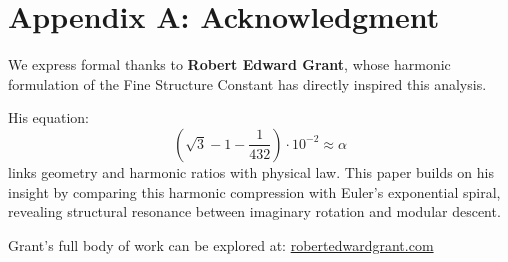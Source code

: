 \documentclass[12pt]{article}
\begin{document}
\appendix

\section*{Appendix A: Acknowledgment}

We express formal thanks to \textbf{Robert Edward Grant}, whose harmonic formulation of the Fine Structure Constant has directly inspired this analysis.

His equation:
\[
\left( \sqrt{3} - 1 - \frac{1}{432} \right) \cdot 10^{-2} \approx \alpha
\]
links geometry and harmonic ratios with physical law. This paper builds on his insight by comparing this harmonic compression with Euler’s exponential spiral, revealing structural resonance between imaginary rotation and modular descent.

Grant’s full body of work can be explored at:  
\href{https://robertedwardgrant.com}{robertedwardgrant.com}
\end{document}
